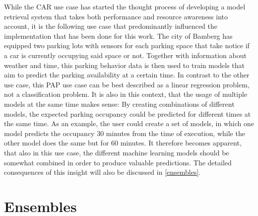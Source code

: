 While the CAR use case has started the thought process of developing a model retrieval system that takes both performance and resource awareness into account, it is the following use case that predominantly influenced the implementation that has been done for this work. The city of Bamberg has equipped two parking lots with sensors for each parking space that take notice if a car is currently occupying said space or not. Together with information about weather and time, this parking behavior data is then used to train models that aim to predict the parking availability at a certain time. In contrast to the other use case, this PAP use case can be best described as a linear regression problem, not a classification problem. It is also in this context, that the usage of multiple models at the same time makes sense: By creating combinations of different models, the expected parking occupancy could be predicted for different times at the same time. As an example, the user could create a set of models, in which one model predicts the occupancy 30 minutes from the time of execution, while the other model does the same but for 60 minutes. It therefore becomes apparent, that also in this use case, the different machine learning models should be somewhat combined in order to produce valuable predictions. The detailed consequences of this insight will also be discussed in \autoref{ensembles}.




\section{Ensembles} \label{ensembles}


